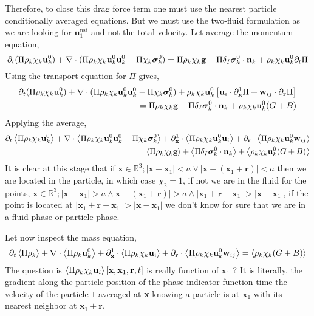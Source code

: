\documentclass[12pt]{My_preprint}
\begin{document}
Therefore, to close this drag force term one must use the nearest particle conditionally averaged equations.
But we must use the two-fluid formulation as we are looking for $\textbf{u}_1^\text{nst}$ and not the total velocity. 
Let average the momentum equation, 
\begin{equation*}
    \partial_t (\Pi \rho_k \chi_k \textbf{u}_k^0)
    + \mathbf{\nabla}\cdot(\Pi \rho_k \chi_k \textbf{u}_k^0 \textbf{u}^0_k 
    - \Pi\chi_k\bm\sigma^0_k)
    =  \Pi\rho_k \chi_k \textbf{g} 
    + \Pi\delta_I \bm\sigma_k^0 \cdot \textbf{n}_k
    + \rho_k \chi_k \textbf{u}_k^0 \partial_t \Pi
\end{equation*}
Using the transport equation for $\Pi$ gives,
\begin{align*}
    \partial_t (\Pi \rho_k \chi_k \textbf{u}_k^0)
    + \mathbf{\nabla}\cdot(\Pi \rho_k \chi_k \textbf{u}_k^0 \textbf{u}^0_k 
    - \Pi\chi_k\bm\sigma^0_k)
    + \rho_k \chi_k \textbf{u}_k^0 \left[
        \textbf{u}_i\cdot \partial_\textbf{x}^1  \Pi
        + \textbf{w}_{ij}\cdot \partial_\textbf{r} \Pi
    \right]\\
    =  \Pi\rho_k \chi_k \textbf{g} 
    + \Pi\delta_I \bm\sigma_k^0 \cdot \textbf{n}_k
    + \rho_k \chi_k \textbf{u}_k^0 (G + B )
\end{align*}
Applying the average, 
\begin{align*}
    \partial_t \left<\Pi \rho_k \chi_k \textbf{u}_k^0\right>
    + \mathbf{\nabla}\cdot\left<\Pi \rho_k \chi_k \textbf{u}_k^0 \textbf{u}^0_k 
    - \Pi\chi_k\bm\sigma^0_k\right>
    + \partial_\textbf{x}^1 \cdot \left<\Pi  \rho_k \chi_k \textbf{u}_k^0 \textbf{u}_i\right>
    + \partial_\textbf{r} \cdot \left<\Pi\rho_k \chi_k \textbf{u}_k^0\textbf{w}_{ij}\right>\\
    =  \left<\Pi\rho_k \chi_k \textbf{g} \right>
    + \left<\Pi \delta_I \bm\sigma_k^0 \cdot \textbf{n}_k\right>
    + \left<\rho_k \chi_k \textbf{u}_k^0 (G + B )\right>
\end{align*}
It is clear at this stage that if $\textbf{x}\in \mathbb{R}^3 ; |\textbf{x}-\textbf{x}_1| < a \vee   |\textbf{x}-(\textbf{x}_1+\textbf{r})| < a $ then we are located in the particle, in which case $\chi_2 = 1$, if not we are in the fluid for the points, 
$\textbf{x}\in \mathbb{R}^3 ; |\textbf{x}-\textbf{x}_1| > a \wedge \textbf{x}-(\textbf{x}_1+\textbf{r})| > a \wedge |\textbf{x}_1 + \textbf{r} -\textbf{x}_1| > |\textbf{x} -\textbf{x}_1| $, if the point is located at  $|\textbf{x}_1 + \textbf{r} -\textbf{x}_1| > |\textbf{x} -\textbf{x}_1| $ we don't know for sure that we are in a fluid phase or particle phase. 

Let now inspect the mass equation, 
\begin{align*}
    \partial_t \left<\Pi \rho_k \right>
    + \mathbf{\nabla}\cdot\left<\Pi \rho_k  \textbf{u}^0_k\right>
    + \partial_\textbf{x}^1 \cdot \left<\Pi  \rho_k \chi_k \textbf{u}_i\right>
    + \partial_\textbf{r} \cdot \left<\Pi\rho_k \chi_k \textbf{u}_k^0\textbf{w}_{ij}\right>
    = \left<\rho_k \chi_k (G + B )\right>
\end{align*}
The question is $\left<\Pi  \rho_k \chi_k \textbf{u}_i\right>[\textbf{x},\textbf{x}_1,\textbf{r},t]$ is really function of $\textbf{x}_1$ ? 
It is literally, the gradient along the particle position of the  phase indicator function time the velocity of the particle $1$ averaged at \textbf{x} knowing a particle is at $\textbf{x}_1$ with its nearest neighbor at $\textbf{x}_1+\textbf{r}$. 
\end{document}
